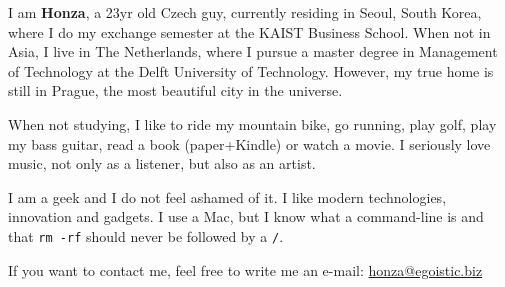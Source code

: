 \documentclass[11pt,twoside,a5paper,landscape]{book}
\begin{document}
\begin{figure}
\centering{}
\vspace{-24pt}
\end{figure}I am \textbf{Honza}, a 23yr old Czech guy, currently residing in Seoul, South Korea, where I do my exchange semester at the KAIST Business School. When not in Asia, I live in The Netherlands, where I pursue a master degree in Management of Technology at the Delft University of Technology. However, my true home is still in Prague, the most beautiful city in the universe.

When not studying, I like to ride my mountain bike, go running, play golf, play my bass guitar, read a book (paper+Kindle) or watch a movie. I seriously love music, not only as a listener, but also as an artist.

I am a geek and I do not feel ashamed of it. I like modern technologies, innovation and gadgets. I use a Mac, but I know what a command-line is and that \texttt{rm -rf} should never be followed by a \texttt{/}.

If you want to contact me, feel free to write me an e-mail: \url{honza@egoistic.biz}

{
\newpage
\thispagestyle{empty}
\mbox{}
}
\end{document}
